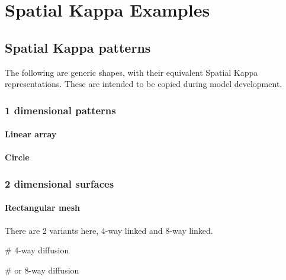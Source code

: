 \chapter{Spatial Kappa Examples}
\label{chap:resources}

\section{Spatial Kappa patterns}
\label{sec:spatialPatterns}

The following are generic shapes, with their equivalent Spatial Kappa representations. These are intended to be copied during model development.


\subsection{1 dimensional patterns}

\subsubsection{Linear array}

\begin{kappasource}
\end{kappasource}

\subsubsection{Circle}

\begin{kappasource}
\end{kappasource}


\subsection{2 dimensional surfaces}

\subsubsection{Rectangular mesh}

There are 2 variants here, 4-way linked and 8-way linked.

\begin{kappasource}

# 4-way diffusion

# or 8-way diffusion
\end{kappasource}


